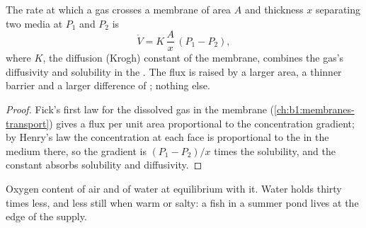 \begin{theorem}\label{thm:b1:gas-exchange:fick}
The rate at which a gas crosses a membrane of area $A$ and thickness
$x$ separating two media at  $P_1$ and $P_2$ is
\[
\dot V = K\,\frac{A}{x}\,(P_1 - P_2),
\]
where $K$, the diffusion (Krogh) constant of the membrane, combines
the gas's diffusivity and solubility in the . The flux is
raised by a larger area, a thinner barrier and a larger difference of
; nothing else.
\end{theorem}
\begin{proof}
Fick's first law for the dissolved gas in the membrane
(\cref{ch:b1:membranes-transport}) gives a flux per unit area
proportional to the concentration gradient; by Henry's law the
concentration at each face is proportional to the  in
the medium there, so the gradient is $(P_1 - P_2)/x$ times the
solubility, and the constant absorbs solubility and diffusivity.
\end{proof}

\begin{omfigure}

{\small Oxygen content of air and of water at equilibrium with it.
Water holds thirty times less, and less still when warm or salty: a
fish in a summer pond lives at the edge of the supply.}
\end{omfigure}

